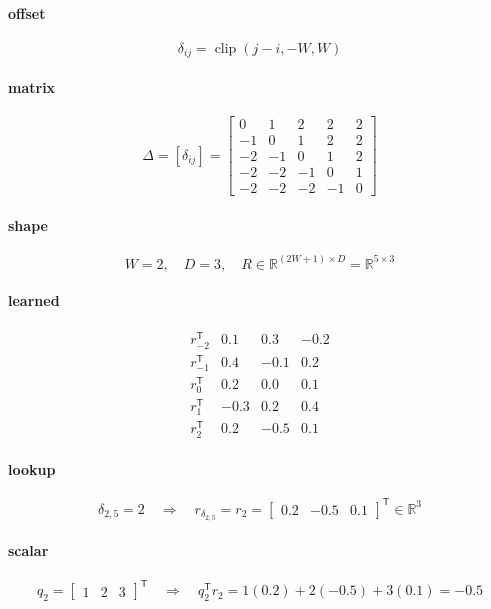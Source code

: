 \documentclass{article}
\begin{document}
\paragraph{offset}
\[
\delta_{ij}=\operatorname{clip}(j-i,-W,W)
\]

\paragraph{matrix}
\[
\Delta=[\delta_{ij}]=\begin{bmatrix}0&1&2&2&2\\-1&0&1&2&\boxed{2}\\-2&-1&0&1&2\\-2&-2&-1&0&1\\-2&-2&-2&-1&0\end{bmatrix}
\]

\paragraph{shape}
\[
W=2,\quad D=3,\quad R\in\mathbb{R}^{(2W+1)\times D}=\mathbb{R}^{5\times3}
\]

\paragraph{learned}
\[
\begin{array}{c|rrr}r_{-2}^{\mathsf T}&0.1&0.3&-0.2\\r_{-1}^{\mathsf T}&0.4&-0.1&0.2\\r_0^{\mathsf T}&0.2&0.0&0.1\\r_1^{\mathsf T}&-0.3&0.2&0.4\\r_2^{\mathsf T}&\boxed{0.2}&\boxed{-0.5}&\boxed{0.1}\end{array}
\]

\paragraph{lookup}
\[
\delta_{2,5}=2\quad\Longrightarrow\quad r_{\delta_{2,5}}=r_2=\begin{bmatrix}0.2&-0.5&0.1\end{bmatrix}^{\mathsf T}\in\mathbb{R}^{3}
\]

\paragraph{scalar}
\[
q_2=\begin{bmatrix}1&2&3\end{bmatrix}^{\mathsf T}\quad\Longrightarrow\quad q_2^{\mathsf T}r_2=1(0.2)+2(-0.5)+3(0.1)=-0.5
\]
\end{document}

